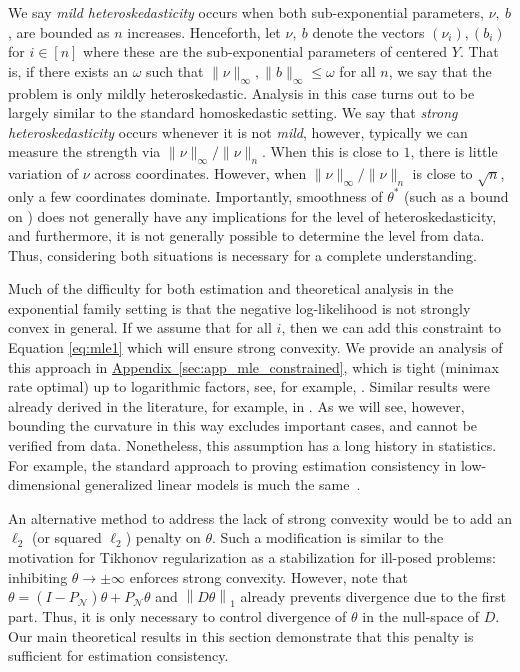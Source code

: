 \documentclass[ejs,noshowframe]{imsart}
\theoremstyle{plain}
\theoremstyle{definition}
\newcommand{\aref}[1]{\hyperref[#1]{Appendix~\ref*{#1}}}
\newcommand{\norm}[1]{\left\lVert #1 \right\rVert}
\newcommand{\cN}{\mathcal{N}}
\begin{document}
We say {\em mild heteroskedasticity} occurs when both sub-exponential parameters,
$\nu,\ b$, are bounded as $n$ increases.   Henceforth, let $\nu,\ b$ denote the
vectors $(\nu_i), (b_i)$ for $i \in [n]$ where these are the sub-exponential
parameters of centered $Y$.  That is, if there exists an $\omega$ such 
that $\| \nu \|_\infty, \| b\|_\infty \le \omega$ for all $n$, we say that the problem is
only mildly heteroskedastic. Analysis in this case turns out to be largely
similar to the standard homoskedastic setting. We say that {\em strong
  heteroskedasticity} occurs whenever it is not {\em mild}, however, typically
we can measure the strength via $\|\nu\|_\infty / \|\nu \|_n$. When this is
close to $1$, there is little variation of $\nu$ across coordinates. 
However,
when $\|\nu\|_\infty / \|\nu\|_n$ is close to $\sqrt{n}$, only a few coordinates
dominate. Importantly, smoothness of $\theta^*$ (such as a bound on 
\smash{$\norm{D\theta^*}_1$}) does not generally have
any implications for the level of heteroskedasticity, and furthermore, it is not
generally possible to determine the level from data. Thus, considering both
situations is necessary for a complete understanding.



Much of the difficulty for both estimation and theoretical analysis in the
exponential family setting is that the negative log-likelihood is not strongly convex in
general. 
If we assume that  for all $i$, then we can 
add this
constraint to Equation \eqref{eq:mle1} which will ensure strong convexity.
We provide an analysis of this approach in
\aref{sec:app_mle_constrained}, which is tight (minimax rate optimal) up to
logarithmic factors, see, for example, \cite{sadhanala2021multivariate}. 
Similar results were already derived in the literature, for example, in \cite{prasad2020robust}.
As we will see, however, bounding the curvature in this way excludes important cases, and
cannot be verified from data.
Nonetheless, this assumption has a long history in statistics. For example, the standard approach
to proving estimation consistency in low-dimensional generalized linear models is much the
same~\citep{mccullagh1989generalized}.

An alternative method to address the lack of strong convexity would be to add an
$\ell_2$ (or squared $\ell_2$) penalty on $\theta$. Such a modification is
similar to the motivation for Tikhonov regularization as a stabilization for
ill-posed problems: inhibiting $\theta \rightarrow \pm\infty$ enforces strong
convexity.  However, note that $\theta = (I - P_\cN)\theta +
P_\cN\theta$ and $\norm{D\theta}_1$ already prevents divergence due to the first
part. Thus, it is only necessary to control divergence of $\theta$ in the
null-space of $D$. Our main theoretical results in this section demonstrate that
this penalty is sufficient for estimation consistency.
\end{document}
